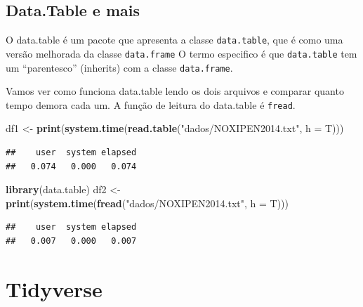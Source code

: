 \documentclass[]{book}
\newenvironment{Shaded}{\begin{snugshade}}{\end{snugshade}}
\newcommand{\KeywordTok}[1]{\textcolor[rgb]{0.13,0.29,0.53}{\textbf{#1}}}
\newcommand{\DataTypeTok}[1]{\textcolor[rgb]{0.13,0.29,0.53}{#1}}
\newcommand{\StringTok}[1]{\textcolor[rgb]{0.31,0.60,0.02}{#1}}
\newcommand{\NormalTok}[1]{#1}
\theoremstyle{definition}
\theoremstyle{definition}
\theoremstyle{definition}
\theoremstyle{remark}
\begin{document}
\subsection{Data.Table e mais}\label{data.table-e-mais}

O data.table é um pacote que apresenta a classe \texttt{data.table}, que
é como uma versão melhorada da classe \texttt{data.frame} O termo
especifico é que \texttt{data.table} tem um ``parentesco'' (inherits)
com a classe \texttt{data.frame}.

Vamos ver como funciona data.table lendo os dois arquivos e comparar
quanto tempo demora cada um. A função de leitura do data.table é
\texttt{fread}.

\begin{Shaded}
\begin{Highlighting}[]
\NormalTok{df1 <-}\StringTok{ }\KeywordTok{print}\NormalTok{(}\KeywordTok{system.time}\NormalTok{(}\KeywordTok{read.table}\NormalTok{(}\StringTok{"dados/NOXIPEN2014.txt"}\NormalTok{, }\DataTypeTok{h =}\NormalTok{ T)))}
\end{Highlighting}
\end{Shaded}

\begin{verbatim}
##    user  system elapsed 
##   0.074   0.000   0.074
\end{verbatim}

\begin{Shaded}
\begin{Highlighting}[]
\KeywordTok{library}\NormalTok{(data.table)}
\NormalTok{df2 <-}\StringTok{ }\KeywordTok{print}\NormalTok{(}\KeywordTok{system.time}\NormalTok{(}\KeywordTok{fread}\NormalTok{(}\StringTok{"dados/NOXIPEN2014.txt"}\NormalTok{, }\DataTypeTok{h =}\NormalTok{ T)))}
\end{Highlighting}
\end{Shaded}

\begin{verbatim}
##    user  system elapsed 
##   0.007   0.000   0.007
\end{verbatim}

\hypertarget{tidyverse}{\section{Tidyverse}\label{tidyverse}}
\end{document}
